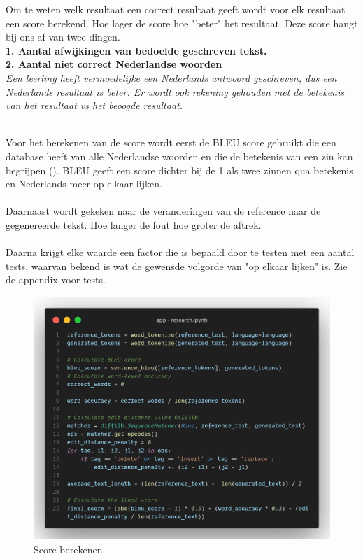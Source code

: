 \documentclass[12pt]{article}
\begin{document}
Om te weten welk resultaat een correct resultaat geeft wordt voor elk resultaat een score berekend. Hoe lager de score hoe "beter" het resultaat. Deze score hangt bij ons af van twee dingen. \\
\textbf{1. Aantal afwijkingen van bedoelde geschreven tekst.}\\
\textbf{2. Aantal niet correct Nederlandse woorden}\\
\hspace{3em}\textit{Een leerling heeft vermoedelijke een Nederlands antwoord geschreven, dus een Nederlands resultaat is beter. Er wordt ook rekening gehouden met de betekenis van het resultaat vs het beoogde resultaat.}\\
\\
\begin{minipage}{0.5\linewidth}
Voor het berekenen van de score wordt eerst de BLEU score gebruikt die een database heeft van alle Nederlandse woorden en die de betekenis van een zin kan begrijpen (\cite{academypublicationBLEUtranslation, aclBLEUevaluation, mediumBLEU}). BLEU geeft een score dichter bij de 1 als twee zinnen qua betekenis en Nederlands meer op elkaar lijken. \\
\\
Daarnaast wordt gekeken naar de veranderingen van de reference naar de gegenereerde tekst. Hoe langer de fout hoe groter de aftrek. \\
\\
Daarna krijgt elke waarde een factor die is bepaald door te testen met een aantal tests, waarvan bekend is wat de gewensde volgorde van "op elkaar lijken" is. 
Zie de appendix voor tests.
\end{minipage}%
\hspace{0.4cm}%
\begin{minipage}{0.5\linewidth}
\begin{figure}[H]
    \centering
    \includegraphics[width=\linewidth]{./images/methoden/inscannen/score/code-score.png}
    \caption{Score berekenen}
    \label{fig:score-calc-code}
\end{figure}
\end{minipage}
\end{document}
